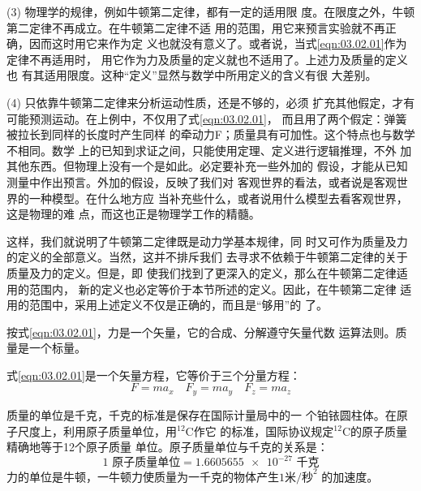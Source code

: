 (3) 物理学的规律，例如牛顿第二定律，都有一定的适用限
度。在限度之外，牛顿第二定律不再成立。在牛顿第二定律不适
用的范围，用它来预言实验就不再正确，因而这时用它来作为定
义也就没有意义了。或者说，当式\eqref{eqn:03.02.01}作为定律不再适用时，
用它作为力及质量的定义就也不适用了。上述力及质量的定义也
有其适用限度。这种“定义”显然与数学中所用定义的含义有很
大差别。

(4) 只依靠牛顿第二定律来分析运动性质，还是不够的，必须
扩充其他假定，才有可能预测运动。在上例中，不仅用了式\eqref{eqn:03.02.01}，
而且用了两个假定：弹簧被拉长到同样的长度时产生同样
的牵动力F；质量具有可加性。这个特点也与数学不相同。数学
上的已知到求证之间，只能使用定理、定义进行逻辑推理，不外
加其他东西。但物理上没有一个是如此。必定要补充一些外加的
假设，才能从已知测量中作出预言。外加的假设，反映了我们对
客观世界的看法，或者说是客观世界的一种模型。在什么地方应
当补充些什么，或者说用什么模型去看客观世界，这是物理的难
点，而这也正是物理学工作的精髓。

这样，我们就说明了牛顿第二定律既是动力学基本规律，同
时又可作为质量及力的定义的全部意义。当然，这并不排斥我们
去寻求不依赖于牛顿第二定律的关于质量及力的定义。但是，即
使我们找到了更深入的定义，那么在牛顿第二定律适用的范围内，
新的定义也必定等价于本节所述的定义。因此，在牛顿第二定律
适用的范围中，采用上述定义不仅是正确的，而且是“够用”的
了。

按式\eqref{eqn:03.02.01}，力是一个矢量，它的合成、分解遵守矢量代数
运算法则。质量是一个标量。

式\eqref{eqn:03.02.01}是一个矢量方程，它等价于三个分量方程：
\begin{equation*}
  F = m a _ { x } \quad F _ { y } = m a _ {y} \quad F _ { z } = m a_ { z }
\end{equation*}

质量的单位是千克，千克的标准是保存在国际计量局中的一
个铂铱圆柱体。在原子尺度上，利用原子质量单位，用$^{12}$C作它
的标准，国际协议规定$^{12}$C的原子质量精确地等于12个原子质量
单位。原子质量单位与千克的关系是：
\begin{equation*}
  1\text{ 原子质量单位} = \num{1.6605655e-27}\text{ 千克}
\end{equation*}
力的单位是牛顿，一牛顿力使质量为一千克的物体产生$1\text{米/秒}^2$
的加速度。
